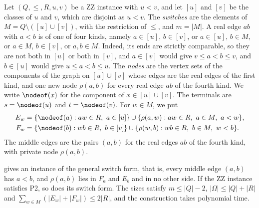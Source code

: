 \begin{definition}
\label{con:zz-switch-form}
Let $(Q, \leq, R, u, v)$ be a ZZ instance with $u < v$, and let $[u]$ and $[v]$ be the classes of $u$ and $v$, which are disjoint as $u < v$.
The \emph{switches} are the elements of $M = Q \setminus ([u] \cup [v])$, with the restriction of $\leq$, and $m = |M|$.
A real edge $ab$ with $a < b$ is of one of four kinds, namely $a \in [u]$, $b \in [v]$, or $a \in [u]$, $b \in M$, or $a \in M$, $b \in [v]$, or $a, b \in M$.
Indeed, its ends are strictly comparable, so they are not both in $[u]$ or both in $[v]$, and $a \in [v]$ would give $v \leq a < b \leq v$, and $b \in [u]$ would give $u \leq a < b \leq u$.
The \emph{nodes} are the vertex sets of the components of the graph on $[u] \cup [v]$ whose edges are the real edges of the first kind, and one new node $\rho(a, b)$ for every real edge $ab$ of the fourth kind.
We write $\nodeof(x)$ for the component of $x \in [u] \cup [v]$.
The terminals are $s = \nodeof(u)$ and $t = \nodeof(v)$.
For $w \in M$, we put
\begin{align*}
E_w &= \{\nodeof(a) : aw \in R,\ a \in [u]\} \cup \{\rho(a, w) : aw \in R,\ a \in M,\ a < w\},\\
F_w &= \{\nodeof(b) : wb \in R,\ b \in [v]\} \cup \{\rho(w, b) : wb \in R,\ b \in M,\ w < b\}.
\end{align*}
The middle edges are the pairs $(a, b)$ for the real edges $ab$ of the fourth kind, with private node $\rho(a, b)$.
\end{definition}

\begin{lemma}
\label{lem:zz-switch-form}
 gives an instance of the general switch form, that is, every middle edge $(a, b)$ has $a < b$, and $\rho(a, b)$ lies in $F_a$ and $E_b$ and in no other side.
If the ZZ instance satisfies P2, so does its switch form.
The sizes satisfy $m \leq |Q| - 2$, $|\Omega| \leq |Q| + |R|$ and $\sum_{w \in M} (|E_w| + |F_w|) \leq 2|R|$, and the construction takes polynomial time.
\end{lemma}

